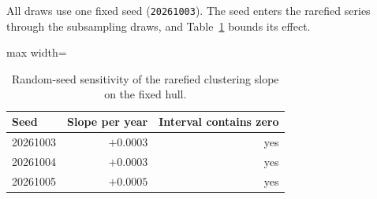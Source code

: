 \documentclass[fleqn,10pt]{wlpeerj}
\begin{document}
All draws use one fixed seed (\texttt{20261003}). The seed enters the rarefied series through
the subsampling draws, and Table~\ref{si:seed} bounds its effect.

\begin{table}[H]
\centering
\caption{Random-seed sensitivity of the rarefied clustering slope on the fixed hull.}
\label{si:seed}
\small
\begin{adjustbox}{max width=\linewidth}
\begin{tabular}{lrr}
\toprule
Seed & Slope per year & Interval contains zero \\
\midrule
20261003 & $+0.0003$ & yes \\
20261004 & $+0.0003$ & yes \\
20261005 & $+0.0005$ & yes \\
\bottomrule
\end{tabular}
\end{adjustbox}
\end{table}
\end{document}
